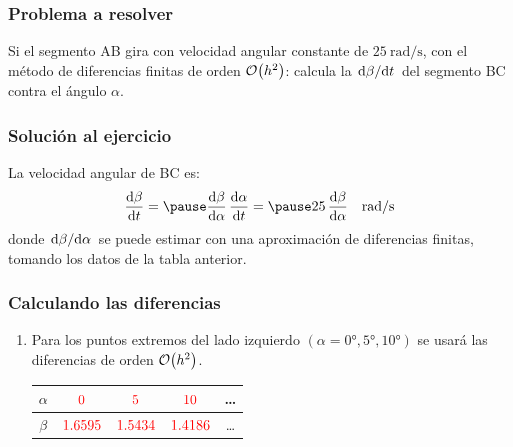 \documentclass[12pt]{beamer}
\begin{document}
\begin{frame}
\frametitle{Problema a resolver}
Si el segmento AB gira con velocidad angular constante de $\SI[per-mode=symbol]{25}{\radian\per\second}$, \pause con el método de diferencias finitas de orden $\order{h^{2}}$: calcula la  $\dv*{\beta}{t}$ del segmento BC contra el ángulo $\alpha$.
\end{frame}
\begin{frame}
\frametitle{Solución al ejercicio}
La velocidad angular de BC es:
\pause
\begin{eqnarray*}
\dv{\beta}{t} = \pause \dv{\beta}{\alpha} \, \dv{\alpha}{t} = \pause 25 \, \dv{\beta}{\alpha} \quad \unit[per-mode=symbol]{\radian\per\second}
\end{eqnarray*}
donde $\dv*{\beta}{\alpha}$ se puede estimar con una aproximación de diferencias finitas, tomando los datos de la tabla anterior.
\end{frame}
\begin{frame}
\frametitle{Calculando las diferencias}
\begin{enumerate}
\item Para los puntos extremos del lado izquierdo $(\alpha = \ang{0}, \ang{5}, \ang{10})$ se usará las diferencias  de orden $\order{h^{2}}$.
\\[1em]
\begin{table}
\centering
\fontsize{10}{10}\selectfont
\begin{tabular}{c | c | c | c | c}
$\alpha$ & $\color{red}{0}$ & $\color{red}{5}$ & $\color{red}{10}$ & \ldots \\ \hline
$\beta$ & $\color{red}{1.6595}$ & $\color{red}{1.5434}$ & $\color{red}{1.4186}$ & \ldots 
\end{tabular}
\end{table}
\seti
\end{enumerate}
\end{frame}
\end{document}
